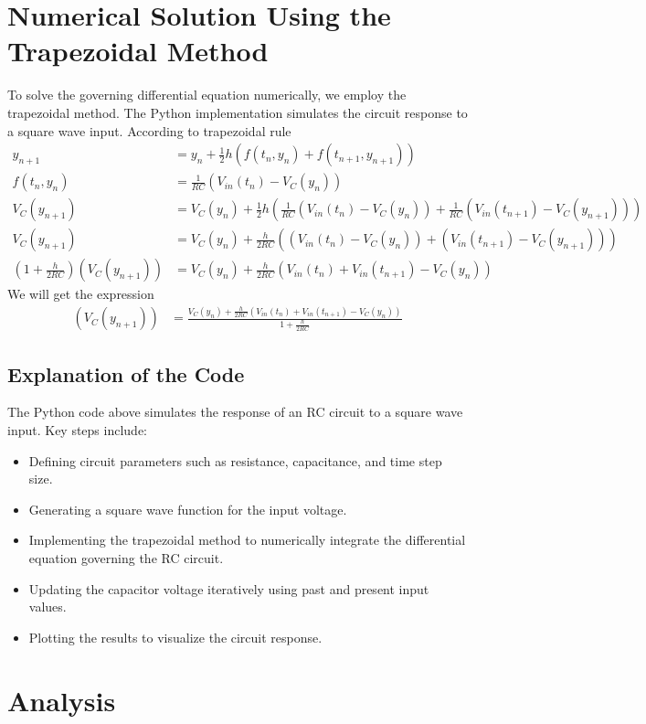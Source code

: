 \documentclass[12pt]{article}
\newcommand{\brak}[1]{\ensuremath{\left(#1\right)}}
\begin{document}
\section{Numerical Solution Using the Trapezoidal Method}
To solve the governing differential equation numerically, we employ the trapezoidal method. The Python implementation simulates the circuit response to a square wave input.\newline
According to trapezoidal rule
\begin{align}
  y_{n+1}&=y_n+\frac{1}{2}h\brak{f(t_n,y_{n}) + f(t_{n+1},y_{n+1})}\\
  f(t_n, y_n) &= \frac{1}{RC}(V_{in}(t_n) - V_{C}(y_n))\\
  V_{C}(y_{n+1})&=V_{C}(y_n)+\frac{1}{2}h (\frac{1}{RC}(V_{in}(t_n) - V_{C}(y_n))+\frac{1}{RC}(V_{in}(t_{n+1}) - V_{C}(y_{n+1})))\\
  V_{C}(y_{n+1})&=V_{C}(y_n)+\frac{h}{2RC}((V_{in}(t_n) - V_{C}(y_n))+(V_{in}(t_{n+1}) - V_{C}(y_{n+1})))\\
  (1+\frac{h}{2RC})(V_{C}(y_{n+1})) &= V_C(y_n)+\frac{h}{2RC}(V_{in}(t_n)+V_{in}(t_{n+1})- V_{C}(y_n))
\end{align}
We will get the expression
\begin{align}
	(V_{C}(y_{n+1})) &= \frac{V_C(y_n)+\frac{h}{2RC}(V_{in}(t_n)+V_{in}(t_{n+1})- V_{C}(y_n))}{1+\frac{h}{2RC}}
\end{align}
\subsection{Explanation of the Code}
The Python code above simulates the response of an RC circuit to a square wave input. Key steps include:
\begin{itemize}
    \item Defining circuit parameters such as resistance, capacitance, and time step size.
    \item Generating a square wave function for the input voltage.
    \item Implementing the trapezoidal method to numerically integrate the differential equation governing the RC circuit.
    \item Updating the capacitor voltage iteratively using past and present input values.
    \item Plotting the results to visualize the circuit response.
\end{itemize}
\section{Analysis}
\end{document}
